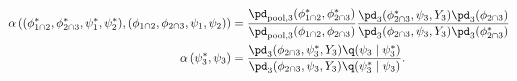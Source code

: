 \begin{align}
  \alpha\left(
    (\phi_{1 \cap 2}^{*}, \phi_{2 \cap 3}^{*}, \psi_{1}^{*}, \psi_{2}^{*}),
    (\phi_{1 \cap 2}, \phi_{2 \cap 3}, \psi_{1}, \psi_{2})
  \right)
  &= \frac{
    \pd_{\text{pool}, 3}(\phi_{1 \cap 2}^{*}, \phi_{2 \cap 3}^{*})
  } {
    \pd_{\text{pool}, 3}(\phi_{1 \cap 2}, \phi_{2 \cap 3})
  }
  \frac {
    \pd_{3}(\phi_{2 \cap 3}^{*}, \psi_{3}, Y_{3})
    \pd_{3}(\phi_{2 \cap 3})
  } {
    \pd_{3}(\phi_{2 \cap 3}, \psi_{3}, Y_{3})
    \pd_{3}(\phi_{2 \cap 3}^{*})
  } 
  \\
  \alpha\left(
    \psi_{3}^{*},
    \psi_{3}
  \right)
  &= 
  \frac {
    \pd_{3}(\phi_{2 \cap 3}, \psi_{3}^{*}, Y_{3})
    \q(\psi_{3} \mid \psi_{3}^{*})
  } {
    \pd_{3}(\phi_{2 \cap 3}, \psi_{3}, Y_{3})
    \q(\psi_{3}^{*} \mid \psi_{3})
  }.
\end{align}